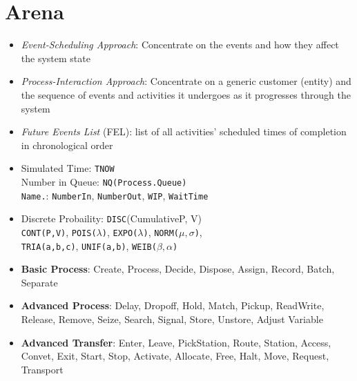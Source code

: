 \documentclass[10pt, twocolumn]{article}
\begin{document}
\section*{Arena}
\begin{itemize}
\item \emph{Event-Scheduling Approach}: Concentrate on the events and how they affect the system state
\item \emph{Process-Interaction Approach}: Concentrate on a generic customer (entity) and the sequence of events and activities it undergoes as it progresses through the system
\item \emph{Future Events List} (FEL): list of all activities’ scheduled times of completion in chronological order
\item Simulated Time: \texttt{TNOW} \\
Number in Queue: \texttt{NQ(Process.Queue)} \\
\texttt{Name.}: \texttt{NumberIn}, \texttt{NumberOut}, \texttt{WIP}, \texttt{WaitTime}
\item Discrete Probaility: \texttt{DISC}(CumulativeP, V) \\ \texttt{CONT(P,V)}, \texttt{POIS($\lambda$)}, \texttt{EXPO($\lambda$)}, \texttt{NORM($\mu,\sigma$)}, \\ \texttt{TRIA(a,b,c)}, \texttt{UNIF(a,b)}, \texttt{WEIB($\beta,\alpha$)}
\item \textbf{Basic Process}: Create, Process, Decide, Dispose, Assign, Record, Batch, Separate 
\item \textbf{Advanced Process}: Delay, Dropoff, Hold, Match, Pickup, ReadWrite, Release, Remove, Seize, Search, Signal, Store, Unstore, Adjust Variable 
\item \textbf{Advanced Transfer}: Enter, Leave, PickStation, Route, Station, Access, Convet, Exit, Start, Stop, Activate, Allocate, Free, Halt, Move, Request, Transport 
\end{itemize}
\end{document}
